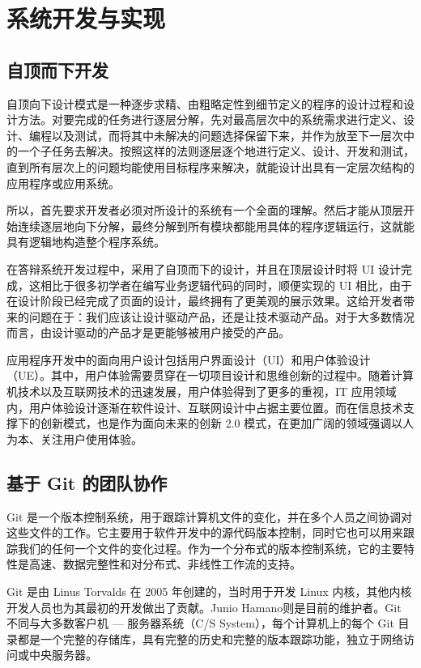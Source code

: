 \section{系统开发与实现}

\subsection{自顶而下开发}

自顶向下设计模式是一种逐步求精、由粗略定性到细节定义的程序的设计过程和设计方法。对要完成的任务进行逐层分解，先对最高层次中的系统需求进行定义、设计、编程以及测试，而将其中未解决的问题选择保留下来，并作为放至下一层次中的一个子任务去解决。按照这样的法则逐层逐个地进行定义、设计、开发和测试，直到所有层次上的问题均能使用目标程序来解决，就能设计出具有一定层次结构的应用程序或应用系统。

所以，首先要求开发者必须对所设计的系统有一个全面的理解。然后才能从顶层开始连续逐层地向下分解，最终分解到所有模块都能用具体的程序逻辑运行，这就能具有逻辑地构造整个程序系统。

在答辩系统开发过程中，采用了自顶而下的设计，并且在顶层设计时将 UI 设计完成，这相比于很多初学者在编写业务逻辑代码的同时，顺便实现的 UI 相比，由于在设计阶段已经完成了页面的设计，最终拥有了更美观的展示效果。这给开发者带来的问题在于：我们应该让设计驱动产品，还是让技术驱动产品。对于大多数情况而言，由设计驱动的产品才是更能够被用户接受的产品。

应用程序开发中的面向用户设计包括用户界面设计（UI）和用户体验设计（UE）。其中，用户体验需要贯穿在一切项目设计和思维创新的过程中。随着计算机技术以及互联网技术的迅速发展，用户体验得到了更多的重视，IT 应用领域内，用户体验设计逐渐在软件设计、互联网设计中占据主要位置。而在信息技术支撑下的创新模式，也是作为面向未来的创新 2.0 模式，在更加广阔的领域强调以人为本、关注用户使用体验。

\subsection{基于 Git 的团队协作}

Git 是一个版本控制系统，用于跟踪计算机文件的变化，并在多个人员之间协调对这些文件的工作。它主要用于软件开发中的源代码版本控制，同时它也可以用来跟踪我们的任何一个文件的变化过程。作为一个分布式的版本控制系统，它的主要特性是高速、数据完整性和对分布式、非线性工作流的支持。

Git 是由 Linus Torvalds 在 2005 年创建的，当时用于开发 Linux 内核，其他内核开发人员也为其最初的开发做出了贡献。Junio Hamano则是目前的维护者。Git 不同与大多数客户机 — 服务器系统（C/S System），每个计算机上的每个 Git 目录都是一个完整的存储库，具有完整的历史和完整的版本跟踪功能，独立于网络访问或中央服务器。

